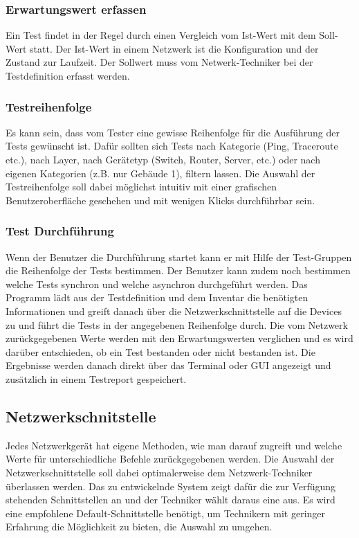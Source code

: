 \documentclass[
	ngerman,
	toc=listof, %
	toc=bibliography, %
	footnotes=multiple, %
	parskip=half, %
	numbers=noendperiod %
]{scrartcl}
\begin{document}
		\subsubsection{Erwartungswert erfassen}
			Ein Test findet in der Regel durch einen Vergleich vom Ist-Wert mit dem Soll-Wert statt. Der Ist-Wert in einem Netzwerk ist die Konfiguration und der Zustand zur Laufzeit. Der Sollwert muss vom Netwerk-Techniker bei der Testdefinition erfasst werden.
			

		\subsubsection{Testreihenfolge}
			Es kann sein, dass vom Tester eine gewisse Reihenfolge für die Ausführung der Tests gewünscht ist. 
			Dafür sollten sich Tests nach Kategorie (Ping, Traceroute etc.), nach Layer, nach Gerätetyp (Switch, Router, Server, etc.) oder nach eigenen Kategorien (z.B. nur Gebäude 1), filtern lassen. 
			Die Auswahl der Testreihenfolge soll dabei möglichst intuitiv mit einer grafischen Benutzeroberfläche geschehen und mit wenigen Klicks durchführbar sein.

		\subsubsection{Test Durchführung}
			Wenn der Benutzer die Durchführung startet kann er mit Hilfe der Test-Gruppen die Reihenfolge der Tests bestimmen. 
			Der Benutzer kann zudem noch bestimmen welche Tests synchron und welche asynchron durchgeführt werden.
			Das Programm lädt aus der Testdefinition und dem Inventar die benötigten Informationen und greift danach über die Netzwerkschnittstelle auf die Devices zu und führt die Tests in der angegebenen Reihenfolge durch.
			Die vom Netzwerk zurückgegebenen Werte werden mit den Erwartungswerten verglichen und es wird darüber entschieden, ob ein Test bestanden oder nicht bestanden ist.
			Die Ergebnisse werden danach direkt über das Terminal oder GUI angezeigt und zusätzlich in einem Testreport gespeichert.
			\newpage

	\subsection{Netzwerkschnitstelle}
		Jedes Netzwerkgerät hat eigene Methoden, wie man darauf zugreift und welche Werte für unterschiedliche Befehle zurückgegebenen werden.
		Die Auswahl der Netzwerkschnittstelle soll dabei optimalerweise dem Netzwerk-Techniker überlassen werden.
		Das zu entwickelnde System zeigt dafür die zur Verfügung stehenden Schnittstellen an und der Techniker wählt daraus eine aus. 
		Es wird eine empfohlene Default-Schnittstelle benötigt, um Technikern mit geringer Erfahrung die Möglichkeit zu bieten, die Auswahl zu umgehen.
\end{document}
